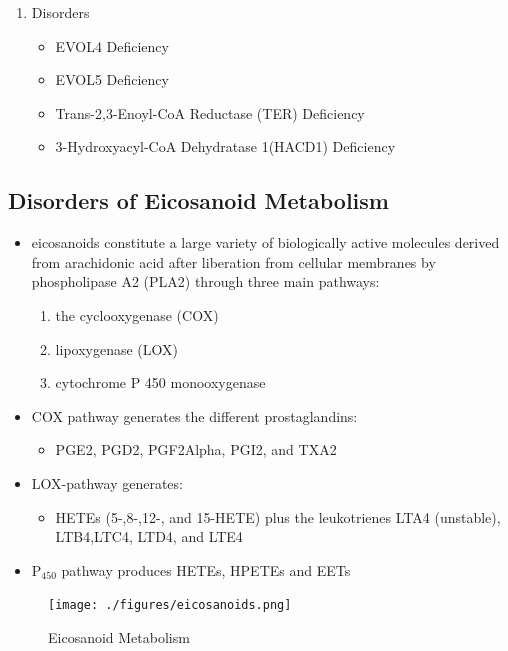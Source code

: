 \documentclass{scrartcl}
\begin{document}
\begin{enumerate}
\item Disorders
\label{sec:org045eeae}
\begin{itemize}
\item EVOL4 Deficiency
\item EVOL5 Deficiency
\item Trans-2,3-Enoyl-CoA Reductase (TER) Deficiency
\item 3-Hydroxyacyl-CoA Dehydratase 1(HACD1) Deficiency
\end{itemize}
\end{enumerate}

\subsection{Disorders of Eicosanoid Metabolism}
\label{sec:org431aa57}
\begin{itemize}
\item eicosanoids constitute a large variety of biologically active
molecules derived from arachidonic acid after liberation from
cellular membranes by phospholipase A2 (PLA2) through three main pathways:
\begin{enumerate}
\item the cyclooxygenase (COX)
\item lipoxygenase (LOX)
\item cytochrome P 450 monooxygenase
\end{enumerate}

\item COX pathway generates the different prostaglandins:
\begin{itemize}
\item PGE2, PGD2, PGF2Alpha, PGI2, and TXA2
\end{itemize}

\item LOX-pathway generates:
\begin{itemize}
\item HETEs (5-,8-,12-, and 15-HETE) plus the leukotrienes LTA4
(unstable), LTB4,LTC4, LTD4, and LTE4
\end{itemize}

\item P\(_{\text{450}}\) pathway produces HETEs, HPETEs and EETs
\end{itemize}

\begin{figure}[htbp]
\centering
\texttt{[image: ./figures/eicosanoids.png]}
\caption{\label{fig:orgb83a2a6}
Eicosanoid Metabolism}
\end{figure}
\end{document}
